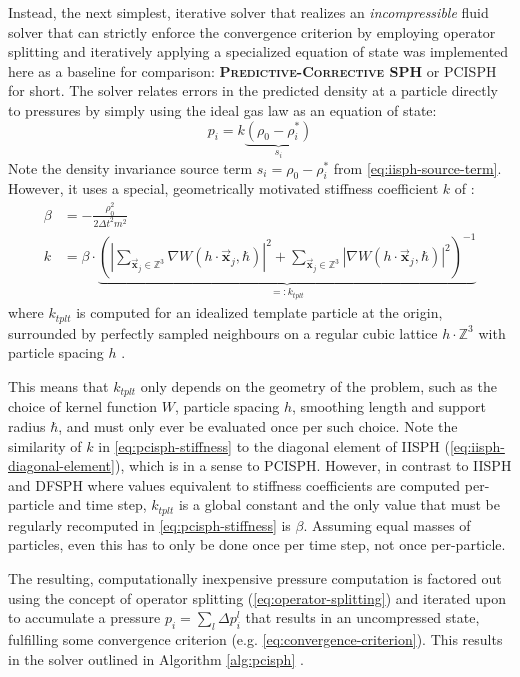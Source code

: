 \documentclass[oneside, a4paper]{book}
\newcommand\emphasis[1]{{\scshape\bfseries#1}}
\newcommand\abs[1]{\left|#1\right|}
\newcommand\vek[1]{\vec{\bm{#1}}}
\newcommand\br[1]{\left(#1\right)}
\begin{document}
  Instead, the next simplest, iterative solver that realizes an \textit{incompressible} fluid solver that can strictly enforce the convergence criterion by employing operator splitting and iteratively applying a specialized equation of state was implemented here as a baseline for comparison: \emphasis{Predictive-Corrective SPH} or PCISPH for short. The solver relates errors in the predicted density at a particle directly to pressures by simply using the ideal gas law as an equation of state:
  \begin{equation}\label{eq:pcisph-eos}
    p_i = k \underbrace{\br{\rho_0-\rho_i^*}}_{s_i}
  \end{equation}
  Note the density invariance source term $s_i = \rho_0-\rho_i^*$ from \autoref{eq:iisph-source-term}. However, it uses a special, geometrically motivated stiffness coefficient $k$ of \autocite{pcisph}:
  \begin{align}
    \beta &= -\frac{\rho_0^2}{2\Delta t^2 m^2}\\
    k &= \beta \cdot \underbrace{{\br{\abs{\sum_{\vek{x}_j \in \mathds{Z}^3} \nabla W\br{h\cdot \vek{x}_j, \hbar}}^2 +\sum_{\vek{x}_j \in \mathds{Z}^3} \abs{\nabla W\br{h\cdot \vek{x}_j, \hbar}}^2}}^{-1}}_{=: k_{tplt}}\label{eq:pcisph-stiffness}
  \end{align}
  where $k_{tplt}$ is computed for an idealized template particle at the origin, surrounded by perfectly sampled neighbours on a regular cubic lattice $h\cdot \mathds{Z}^3$ with particle spacing $h$ \autocite{pcisph}. 
  
  This means that $k_{tplt}$ only depends on the geometry of the problem, such as the choice of kernel function $W$, particle spacing $h$, smoothing length and support radius $\hbar$, and must only ever be evaluated once per such choice. Note the similarity of $k$ in \autoref{eq:pcisph-stiffness} to the diagonal element of IISPH (\autoref{eq:iisph-diagonal-element}), which is in a sense \autocite[equivalent]{2022-survey-equographics-star} to PCISPH. However, in contrast to IISPH and DFSPH where values equivalent to stiffness coefficients are computed per-particle and time step, $k_{tplt}$ is a global constant and the only value that must be regularly recomputed in \autoref{eq:pcisph-stiffness} is $\beta$. Assuming equal masses of particles, even this has to only be done once per time step, not once per-particle.
   
  
  The resulting, computationally inexpensive pressure computation is factored out using the concept of operator splitting (\autoref{eq:operator-splitting}) and iterated upon to accumulate a pressure $p_i=\sum_l \Delta p_i^l$ that results in an uncompressed state, fulfilling some convergence criterion (e.g. \autoref{eq:convergence-criterion}). This results in the solver outlined in Algorithm \ref{alg:pcisph} \autocite{pcisph}.
\end{document}
